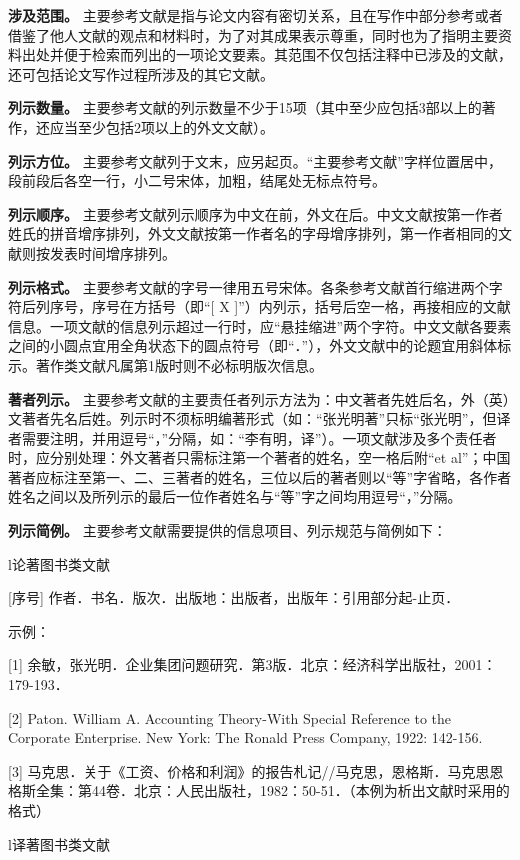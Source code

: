 \documentclass[singlesided]{Style/ucasthesis}%
\begin{document}
\textbf{涉及范围。} 主要参考文献是指与论文内容有密切关系，且在写作中部分参考或者借鉴了他人文献的观点和材料时，为了对其成果表示尊重，同时也为了指明主要资料出处并便于检索而列出的一项论文要素。其范围不仅包括注释中已涉及的文献，还可包括论文写作过程所涉及的其它文献。

\textbf{列示数量。} 主要参考文献的列示数量不少于15项（其中至少应包括3部以上的著作，还应当至少包括2项以上的外文文献）。

\textbf{列示方位。} 主要参考文献列于文末，应另起页。``主要参考文献''字样位置居中，段前段后各空一行，小二号宋体，加粗，结尾处无标点符号。

\textbf{列示顺序。} 主要参考文献列示顺序为中文在前，外文在后。中文文献按第一作者姓氏的拼音增序排列，外文文献按第一作者名的字母增序排列，第一作者相同的文献则按发表时间增序排列。

\textbf{列示格式。} 主要参考文献的字号一律用五号宋体。各条参考文献首行缩进两个字符后列序号，序号在方括号（即``{[} X {]}''）内列示，括号后空一格，再接相应的文献信息。一项文献的信息列示超过一行时，应``悬挂缩进''两个字符。中文文献各要素之间的小圆点宜用全角状态下的圆点符号（即``．''），外文文献中的论题宜用斜体标示。著作类文献凡属第1版时则不必标明版次信息。

\textbf{著者列示。} 主要参考文献的主要责任者列示方法为：中文著者先姓后名，外（英）文著者先名后姓。列示时不须标明编著形式（如：``张光明著''只标``张光明''，但译者需要注明，并用逗号``，''分隔，如：``李有明，译''）。一项文献涉及多个责任者时，应分别处理：外文著者只需标注第一个著者的姓名，空一格后附``et al''；中国著者应标注至第一、二、三著者的姓名，三位以后的著者则以``等''字省略，各作者姓名之间以及所列示的最后一位作者姓名与``等''字之间均用逗号``，''分隔。

\textbf{列示简例。} 主要参考文献需要提供的信息项目、列示规范与简例如下：

l论著图书类文献

{[}序号{]} 作者．书名．版次．出版地：出版者，出版年：引用部分起-止页．

示例：

{[}1{]} 余敏，张光明．企业集团问题研究．第3版．北京：经济科学出版社，2001：179-193．

{[}2{]} Paton. William A. Accounting Theory-With Special Reference to the Corporate Enterprise. New York: The Ronald Press Company, 1922: 142-156.

{[}3{]} 马克思．关于《工资、价格和利润》的报告札记//马克思，恩格斯．马克思恩格斯全集：第44卷．北京：人民出版社，1982：50-51．（本例为析出文献时采用的格式）

l译著图书类文献
\end{document}
